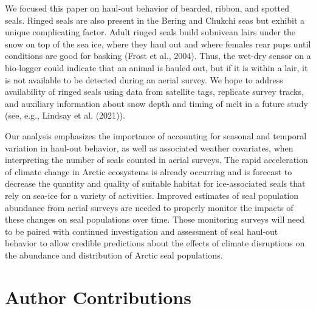 \documentclass[fleqn,10pt,lineno]{wlpeerj} %
\begin{document}
We focused this paper on haul-out behavior of bearded, ribbon, and spotted
seals. Ringed seals are also present in the Bering and Chukchi seas but exhibit
a unique complicating factor. Adult ringed seals build subnivean lairs under the
snow on top of the sea ice, where they haul out and where females rear pups
until conditions are good for basking (Frost et al., 2004). Thus, the wet-dry sensor on
a bio-logger could indicate that an animal is hauled out, but if it is within a
lair, it is not available to be detected during an aerial survey. We hope to
address availability of ringed seals using data from satellite tags, replicate
survey tracks, and auxiliary information about snow depth and timing of melt in
a future study (see, e.g., Lindsay et al. (2021)).

Our analysis emphasizes the importance of accounting for seasonal and temporal
variation in haul-out behavior, as well as associated weather covariates,
when interpreting the number of seals counted in aerial surveys. The rapid
acceleration of climate change in Arctic ecosystems is already occurring and is
forecast to decrease the quantity and quality of suitable habitat for
ice-associated seals that rely on sea-ice for a variety of activities. Improved
estimates of seal population abundance from aerial surveys are needed to
properly monitor the impacts of these changes on seal populations over time.
Those monitoring surveys will need to be paired with continued investigation and
assessment of seal haul-out behavior to allow credible predictions about the
effects of climate disruptions on the abundance and distribution of Arctic seal
populations.

\hypertarget{author-contributions}{%
\section*{Author Contributions}\label{author-contributions}}
\end{document}
